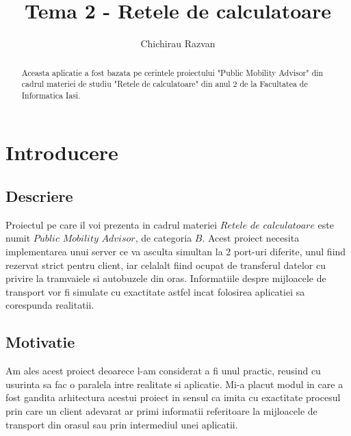 \documentclass{llncs}
\begin{document}
\title{Tema 2 - Retele de calculatoare}
\author{Chichirau Razvan}

\maketitle

\begin{abstract}
Aceasta aplicatie a fost bazata pe cerintele proiectului "Public Mobility Advisor" din cadrul materiei de studiu "Retele de calculatoare" din anul 2 de la Facultatea de Informatica Iasi.
\end{abstract}




\section{Introducere}

\subsection{Descriere}
\hspace{4mm} Proiectul pe care il voi prezenta in cadrul materiei $Retele$ $de$ $calculatoare$ este numit $Public$ $Mobility$ $Advisor$, de categoria $B$. Acest proiect necesita implementarea unui server ce va asculta simultan la 2 port-uri diferite, unul fiind rezervat strict pentru client, iar celalalt fiind ocupat de transferul datelor cu privire la tramvaiele si autobuzele din oras. Informatiile despre mijloacele de transport vor fi simulate cu exactitate astfel incat folosirea aplicatiei sa corespunda realitatii.

\subsection{Motivatie}
\hspace{4mm} Am ales acest proiect deoarece l-am considerat a fi unul practic, reusind cu usurinta sa fac o paralela intre realitate si aplicatie. Mi-a placut modul in care a fost gandita arhitectura acestui proiect in sensul ca imita cu exactitate procesul prin care un client adevarat ar primi informatii referitoare la mijloacele de transport din orasul sau prin intermediul unei aplicatii.
\end{document}
